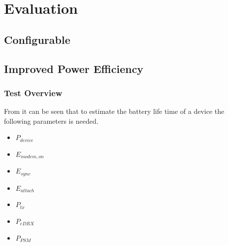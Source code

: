 \section{Evaluation}


\subsection{Configurable}





\subsection{Improved Power Efficiency}
\subsubsection{Test Overview}
From  it can be seen that to estimate the battery life time of a device the following parameters is needed.
\begin{itemize}
\item $P_{device}$
\item $E_{modem,on}$
\item $E_{sync}$
\item $E_{attach}$
\item $P_{tx}$
\item $P_{eDRX}$
\item $P_{PSM}$
\end{itemize}

